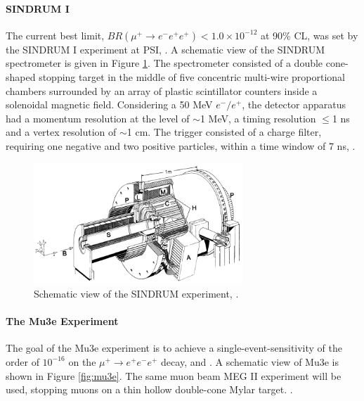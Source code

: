 \paragraph{SINDRUM I}
The current best limit, $BR(\mu^+ \rightarrow e^- e^+ e^+) < 1.0 \times 10^{- 12}$ at 90\% CL, was set by the
SINDRUM I experiment at PSI, \cite{sindrumi}. A schematic view of the SINDRUM spectrometer is given in Figure \ref{fig:sindrumi}. 
The spectrometer consisted of a double cone-shaped stopping target in the middle of five concentric multi-wire proportional chambers surrounded by an array of plastic
scintillator counters inside a solenoidal magnetic field. Considering a 50 MeV $e^-/e^+$, the detector 
apparatus had a momentum resolution at the level of $\sim$1 MeV,
a timing resolution $\leq$1 ns and a vertex resolution of $\sim$1 cm. 
The trigger consisted of a charge filter, requiring one negative and two 
positive particles, within a time window of 7 ns, \cite{universe8060299}.
\begin{figure}[!h]
\centering
\includegraphics[width =0.7\textwidth]{figures/png/The-SINDRUM-I-detector-in-the-horizontal-operating-orientation.png}
\caption[SINDRUM experiment.]{Schematic view of the SINDRUM experiment, \cite{sindrumi}.}
\label{fig:sindrumi}
\end{figure}

\paragraph{The Mu3e Experiment}
The goal of the Mu3e experiment is to achieve a single-event-sensitivity of the order
of $10^{-16}$ on the $\mu^+ \rightarrow e^+ e^-  e^+ $ decay, \cite{hesketh2022mu3e} and \cite{papa}. 
A schematic view of Mu3e is shown in Figure \ref{fig:mu3e}.
The same muon beam  MEG II experiment will be used, stopping muons on a thin hollow double-cone Mylar target. 
.

